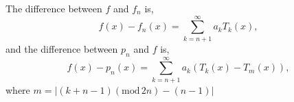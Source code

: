 \begin{ncor}
   The difference between $f$ and $f_n$ is,
   $$ f(x) - f_n(x) = \sum_{k = n+1}^\infty a_k T_k(x), $$
   and the difference between $p_n$ and $f$ is,
   $$ f(x) - p_n(x) = \sum_{k = n+1}^\infty a_k(T_k(x) - T_{m}(x)), $$
   where $m = |(k + n - 1)(\mathrm{mod}\, 2n) - (n - 1)|$
\end{ncor}